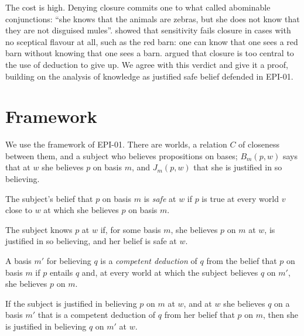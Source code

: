 \documentclass{situationist-preprint}
\begin{document}
The cost is high. Denying closure commits one to what \citet{DeRose1995} called abominable conjunctions: \enquote{she knows that the animals are zebras, but she does not know that they are not disguised mules}. \citet{Kripke2011} showed that sensitivity fails closure in cases with no sceptical flavour at all, such as the red barn: one can know that one sees a red barn without knowing that one sees a barn. \citet{Hawthorne2005} argued that closure is too central to the use of deduction to give up. We agree with this verdict and give it a proof, building on the analysis of knowledge as justified safe belief defended in EPI-01.

\section{Framework}

We use the framework of EPI-01. There are worlds, a relation $C$ of closeness between them, and a subject who believes propositions on bases; $B_m(p,w)$ says that at $w$ she believes $p$ on basis $m$, and $J_m(p,w)$ that she is justified in so believing.

\begin{definition}[Safety]\label{d:safety}
The subject's belief that $p$ on basis $m$ is \emph{safe} at $w$ if $p$ is true at every world $v$ close to $w$ at which she believes $p$ on basis $m$.
\end{definition}

\begin{definition}[Knowledge]\label{d:knowledge}
The subject knows $p$ at $w$ if, for some basis $m$, she believes $p$ on $m$ at $w$, is justified in so believing, and her belief is safe at $w$.
\end{definition}

\begin{definition}\label{d:deduction}
A basis $m'$ for believing $q$ is a \emph{competent deduction} of $q$ from the belief that $p$ on basis $m$ if $p$ entails $q$ and, at every world at which the subject believes $q$ on $m'$, she believes $p$ on $m$.
\end{definition}

\begin{assumption}\label{a:jclosure}
If the subject is justified in believing $p$ on $m$ at $w$, and at $w$ she believes $q$ on a basis $m'$ that is a competent deduction of $q$ from her belief that $p$ on $m$, then she is justified in believing $q$ on $m'$ at $w$.
\end{assumption}
\end{document}
